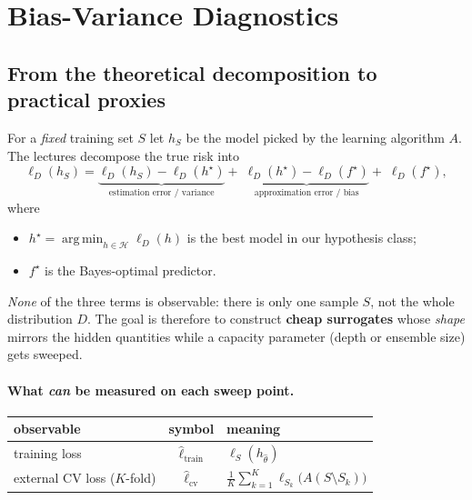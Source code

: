 \documentclass[12pt]{report}
\begin{document}
\section{Bias-Variance Diagnostics}

\subsection{From the theoretical decomposition to practical proxies}

For a \emph{fixed} training set $S$ let $h_S$ be the model picked by the learning
algorithm $A$.  The lectures decompose the true risk into
\[
  \ell_D(h_S)=
  \underbrace{\ell_D(h_S)-\ell_D(h^\star)}_{\text{estimation error / variance}}
  +\;\underbrace{\ell_D(h^\star)-\ell_D(f^\star)}_{\text{approximation error / bias}}
  +\;\ell_D(f^\star),
\]
where
\begin{itemize}
  \item $h^\star=
        \operatorname*{arg\,min}_{h\in\mathcal H}\ell_D(h)$ is the best model
        in our hypothesis class;
  \item $f^\star$ is the Bayes-optimal predictor.
\end{itemize}

\emph{None} of the three terms  is observable: there is only one sample $S$, not the 
whole distribution $D$.  The goal is therefore to construct \textbf{cheap surrogates} 
whose \emph{shape} mirrors the hidden quantities while a capacity parameter 
(depth or ensemble size) gets sweeped.

\paragraph{What \emph{can} be measured on each sweep point.}

\begin{center}
\begin{tabular}{lcl}
  \toprule
  observable & symbol & meaning \\ \midrule
  training loss & $\widehat \ell_{\text{train}}$
               & $\ell_S(h_{\hat{\theta}})$ \\
  external CV loss ($K$-fold)
               & $\widehat \ell_{\text{cv}}$
               & $\displaystyle
                 \frac1K\sum_{k=1}^{K}
                 \ell_{S_k}\bigl(A(S\setminus S_k)\bigr)$ \\ \bottomrule
\end{tabular}
\end{center}
\end{document}
